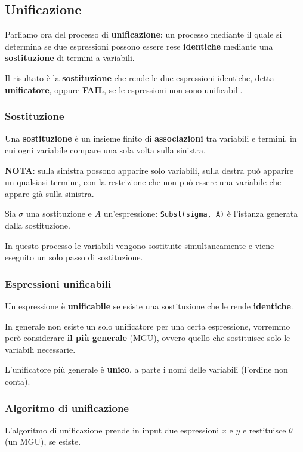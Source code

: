 \subsection{Unificazione}
Parliamo ora del processo di \textbf{unificazione}: un processo mediante il quale si determina se due espressioni
possono essere rese \textbf{identiche} mediante una \textbf{sostituzione} di termini a variabili.

Il risultato \`e la \textbf{sostituzione} che rende le due espressioni identiche, detta \textbf{unificatore},
oppure \textbf{FAIL}, se le espressioni non sono unificabili.

\subsubsection{Sostituzione}
Una \textbf{sostituzione} \`e un insieme finito di \textbf{associazioni} tra variabili e termini, in cui ogni
variabile compare una sola volta sulla sinistra.

\textbf{NOTA}: sulla sinistra possono apparire solo variabili, sulla destra pu\`o apparire un qualsiasi
termine, con la restrizione che non pu\`o essere una variabile che appare gi\`a sulla sinistra.

Sia $\sigma$ una sostituzione e $A$ un'espressione: \verb|Subst(sigma, A)| \`e l'istanza generata dalla
sostituzione.

In questo processo le variabili vengono sostituite simultaneamente e viene eseguito un solo passo di sostituzione.

\subsubsection{Espressioni unificabili}
Un espressione \`e \textbf{unificabile} se esiste una sostituzione che le rende \textbf{identiche}.

In generale non esiste un solo unificatore per una certa espressione, vorremmo per\`o considerare
\textbf{il pi\`u generale} (MGU), ovvero quello che sostituisce solo le variabili necessarie.

\begin{theorem}
	L'unificatore pi\`u generale \`e \textbf{unico}, a parte i nomi delle variabili (l'ordine non conta).
\end{theorem}

\subsubsection{Algoritmo di unificazione}
L'algoritmo di unificazione prende in input due espressioni $x$ e $y$ e restituisce $\theta$ (un MGU), se esiste.

